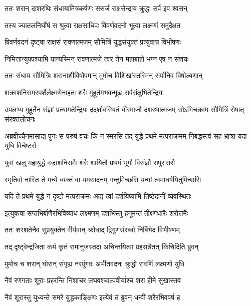 
\twolineshloka
{ततः शरान् दाशरथिः संधायामित्रकर्षणः}
{ससर्ज राक्षसेन्द्राय क्रुद्धः सर्प इव श्वसन्} %

\twolineshloka
{तस्य ज्यातलनिर्घोषं स श्रुत्वा राक्षसाधिपः}
{विवर्णवदनो भूत्वा लक्ष्मणं समुदैक्षत} %

\twolineshloka
{विवर्णवदनं दृष्ट्वा राक्षसं रावणात्मजम्}
{सौमित्रिं युद्धसंयुक्तं प्रत्युवाच विभीषणः} %

\twolineshloka
{निमित्तान्युपपश्यामि यान्यस्मिन् रावणात्मजे}
{त्वर तेन महाबाहो भग्न एष न संशयः} %

\twolineshloka
{ततः संधाय सौमित्रिः शरानाशीविषोपमान्}
{मुमोच विशिखांस्तस्मिन् सर्पानिव विषोल्बणान्} %

\twolineshloka
{शक्राशनिसमस्पर्शैर्लक्ष्मणेनाहतः शरैः}
{मुहूर्तमभवन्मूढः सर्वसंक्षुभितेन्द्रियः} %

\threelineshloka
{उपलभ्य मुहूर्तेन संज्ञां प्रत्यागतेन्द्रियः}
{ददर्शावस्थितं वीरमाजौ दशरथात्मजम्}
{सोऽभिचक्राम सौमित्रिं रोषात् संरक्तलोचनः} %

\threelineshloka
{अब्रवीच्चैनमासाद्य पुनः स परुषं वचः}
{किं न स्मरसि तद् युद्धे प्रथमे मत्पराक्रमम्}
{निबद्धस्त्वं सह भ्रात्रा यदा युधि विचेष्टसे} %

\twolineshloka
{युवां खलु महायुद्धे वज्राशनिसमैः शरैः}
{शायितौ प्रथमं भूमौ विसंज्ञौ सपुरःसरौ} %

\twolineshloka
{स्मृतिर्वा नास्ति ते मन्ये व्यक्तं वा यमसादनम्}
{गन्तुमिच्छसि यन्मां त्वमाधर्षयितुमिच्छसि} %

\twolineshloka
{यदि ते प्रथमे युद्धे न दृष्टो मत्पराक्रमः}
{अद्य त्वां दर्शयिष्यामि तिष्ठेदानीं व्यवस्थितः} %

\twolineshloka
{इत्युक्त्वा सप्तभिर्बाणैरभिविव्याध लक्ष्मणम्}
{दशभिस्तु हनूमन्तं तीक्ष्णधारैः शरोत्तमैः} %

\twolineshloka
{ततः शरशतेनैव सुप्रयुक्तेन वीर्यवान्}
{क्रोधाद् द्विगुणसंरब्धो निर्बिभेद विभीषणम्} %

\twolineshloka
{तद् दृष्ट्वेन्द्रजिता कर्म कृतं रामानुजस्तदा}
{अचिन्तयित्वा प्रहसन्नैतत् किंचिदिति ब्रुवन्} %

\twolineshloka
{मुमोच च शरान् घोरान् संगृह्य नरपुंगवः}
{अभीतवदनः क्रुद्धो रावणिं लक्ष्मणो युधि} %

\twolineshloka
{नैवं रणगताः शूराः प्रहरन्ति निशाचर}
{लघवश्चाल्पवीर्याश्च शरा हीमे सुखास्तव} %

\twolineshloka
{नैवं शूरास्तु युध्यन्ते समरे युद्धकाङ्क्षिणः}
{इत्येवं तं ब्रुवन् धन्वी शरैरभिववर्ष ह} %

